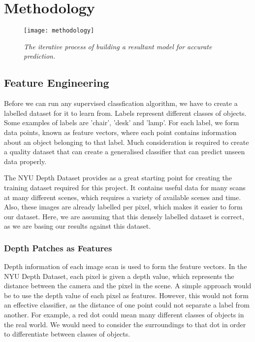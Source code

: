 \documentclass[dissertation.tex]{subfiles}
\begin{document}
\chapter{Methodology}
\label{chap:methodology}

\begin{figure}[h]
  \centering
  \texttt{[image: methodology]}
  \caption{\textit{The iterative process of building a resultant model for accurate prediction.}}
  \label{fig:methodology}
\end{figure}

\section{Feature Engineering}
Before we can run any supervised classfication algorithm, we have to create a labelled dataset for it to learn from. Labels represent different classes of objects. Some examples of labels are 'chair', 'desk' and 'lamp'. For each label, we form data points, known as feature vectors, where each point contains information about an object belonging to that label. Much consideration is required to create a quality dataset that can create a generalised classifier that can predict unseen data properly.

The NYU Depth Dataset provides as a great starting point for creating the training dataset required for this project. It contains useful data for many scans at many different scenes, which requires a variety of available scenes and time. Also, these images are already labelled per pixel, which makes it easier to form our dataset. Here, we are assuming that this densely labelled dataset is correct, as we are basing our results against this dataset.

\subsection{Depth Patches as Features}
Depth information of each image scan is used to form the feature vectors. In the NYU Depth Dataset, each pixel is given a depth value, which represents the distance between the camera and the pixel in the scene. A simple approach would be to use the depth value of each pixel as features. However, this would not form an effective classifier, as the distance of one point could not separate a label from another. For example, a red dot could mean many different classes of objects in the real world. We would need to consider the surroundings to that dot in order to differentiate between classes of objects.
\end{document}
